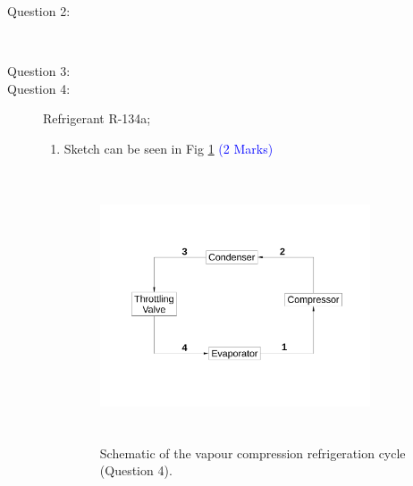 \documentclass[12pt,twoside]{report}
\begin{document}
\begin{description}
\clearpage

\item [Question 2:] \mbox{}\\

\clearpage

\item [Question 3:]

\clearpage


\item [Question 4:] Refrigerant R-134a;\\
 
\begin{enumerate}

\item Sketch can be seen in Fig \ref{Ex02:Q04} \textcolor{blue}{(2 Marks)}
\begin{figure}[h]
\label{Ex02:Q04}
\begin{center}
\includegraphics[width=8.0cm,height=8.0cm]{./Pics/Exam_Refrigeration4}
\vspace{-1.9cm}
\caption{Schematic of the vapour compression refrigeration cycle (Question 4).}
\end{center}
\end{figure}



\end{enumerate}
\end{description}
\end{document}
